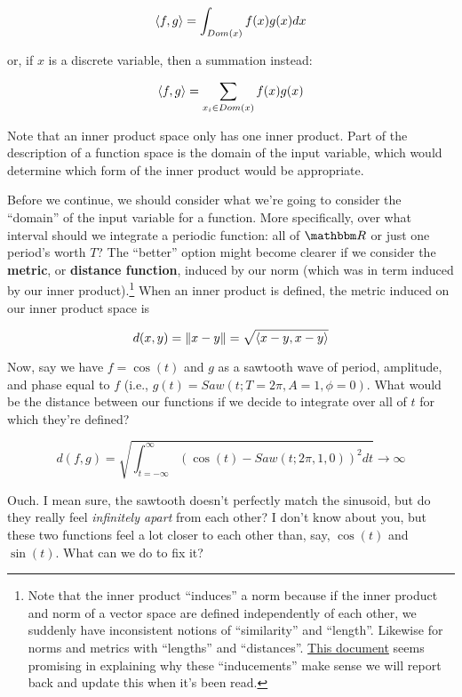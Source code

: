 \documentclass[../main/main.tex]{subfiles}
\begin{document}
\[\left<f,g\right> = \int_{Dom(x)} f(x)g(x) dx \]

or, if \(x\) is a discrete variable, then a summation instead:

\[\left<f,g\right> = \sum_{x_i \in Dom(x)} f(x)g(x) \]

Note that an inner product space only has one inner product.
Part of the description of a function space is the domain 
of the input variable, which would determine which form
of the inner product would be appropriate.\par

Before we continue, we should consider what we're going to
consider the ``domain'' of the input variable for a function.
More specifically, over what interval should we integrate
a periodic function: all of \(\domain{R}\) or just one period's
worth \(T\)?
The ``better'' option might become clearer if we consider
the \textbf{metric}, or \textbf{distance function},
induced by our norm (which was in term induced by our
inner product).\footnote{
  Note that the inner product ``induces'' a norm
  because if the inner product and norm of a vector space
  are defined independently of each other,
  we suddenly have inconsistent notions of ``similarity''
  and ``length''. Likewise for norms and metrics
  with ``lengths'' and ``distances''.
  \href{http://people.math.gatech.edu/~heil/books/metricbrief.pdf}{This document}
  seems promising in explaining why these ``inducements''
  make sense \textemdash{} we will report back and
  update this when it's been read.
}
When an inner product is defined, the metric 
induced on our inner product space is

\[d(x,y) = \norm{x-y} = \sqrt{\left<x-y,x-y\right>} \]

Now, say we have \(f = \cos(t)\) and \(g\) as a sawtooth
wave of period, amplitude, and phase equal to \(f\)
(i.e., \(g(t) = Saw(t; T = 2\pi, A = 1, \phi = 0)\).
What would be the distance between our functions if
we decide to integrate over all of \(t\) for which
they're defined?

\[d(f,g) = \sqrt{\int_{t = -\infty}^{\infty} \left(\cos(t) - Saw(t; 2\pi, 1, 0)\right)^2 dt} \rightarrow \infty \]

Ouch. I mean sure, the sawtooth doesn't perfectly match
the sinusoid, but do they really feel \emph{infinitely apart}
from each other? I don't know about you, but these two
functions feel a lot closer to each other than, say,
\(\cos(t)\) and \(\sin(t)\). What can we do to fix it?\par
\end{document}

